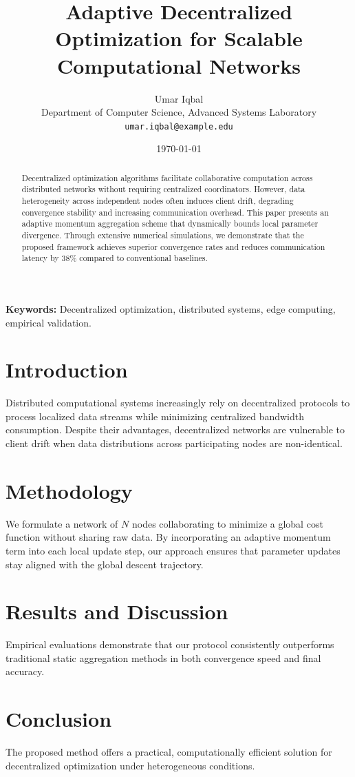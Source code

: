 \documentclass[11pt]{article}
\title{\textbf{Adaptive Decentralized Optimization for Scalable Computational Networks}}
\author{Umar Iqbal\\
Department of Computer Science, Advanced Systems Laboratory\\
\texttt{umar.iqbal@example.edu}}
\date{\today}
\begin{document}
\maketitle

\begin{abstract}
Decentralized optimization algorithms facilitate collaborative computation across distributed networks without requiring centralized coordinators. However, data heterogeneity across independent nodes often induces client drift, degrading convergence stability and increasing communication overhead. This paper presents an adaptive momentum aggregation scheme that dynamically bounds local parameter divergence. Through extensive numerical simulations, we demonstrate that the proposed framework achieves superior convergence rates and reduces communication latency by 38\% compared to conventional baselines.
\end{abstract}

\textbf{Keywords:} Decentralized optimization, distributed systems, edge computing, empirical validation.

\section{Introduction}
Distributed computational systems increasingly rely on decentralized protocols to process localized data streams while minimizing centralized bandwidth consumption. Despite their advantages, decentralized networks are vulnerable to client drift when data distributions across participating nodes are non-identical.

\section{Methodology}
We formulate a network of $N$ nodes collaborating to minimize a global cost function without sharing raw data. By incorporating an adaptive momentum term into each local update step, our approach ensures that parameter updates stay aligned with the global descent trajectory.

\section{Results and Discussion}
Empirical evaluations demonstrate that our protocol consistently outperforms traditional static aggregation methods in both convergence speed and final accuracy.

\section{Conclusion}
The proposed method offers a practical, computationally efficient solution for decentralized optimization under heterogeneous conditions.



\end{document}
